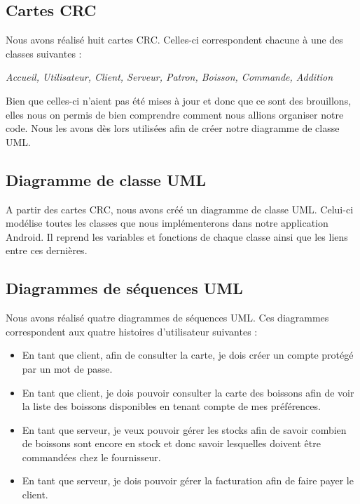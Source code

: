 \documentclass[11pt, a4, oneside, headings=normal]{scrreprt}
\begin{document}
\subsection*{Cartes CRC}

Nous avons réalisé huit cartes CRC. Celles-ci correspondent chacune à une des classes suivantes :

\begin{center}
\emph{Accueil, Utilisateur, Client, Serveur, Patron, Boisson, Commande, Addition}
\end{center}

Bien que celles-ci n'aient pas été mises à jour et donc que ce sont des brouillons, elles nous on permis de bien comprendre comment nous allions organiser notre code. Nous les avons dès lors utilisées afin de créer notre diagramme de classe UML.

\subsection*{Diagramme de classe UML}

A partir des cartes CRC, nous avons créé un diagramme de classe UML. Celui-ci modélise toutes les classes que nous implémenterons dans notre application Android. Il reprend les variables et fonctions de chaque classe ainsi que les liens entre ces dernières.

\subsection*{Diagrammes de séquences UML}

Nous avons réalisé quatre diagrammes de séquences UML. Ces diagrammes correspondent aux quatre histoires d'utilisateur suivantes : 

\begin{itemize}
\item En tant que client, afin de consulter la carte, je dois créer un compte protégé par un mot de passe.
\item En tant que client, je dois pouvoir consulter la carte des boissons afin de voir la liste des boissons disponibles en tenant compte de mes préférences.
\item En tant que serveur, je veux pouvoir gérer les stocks afin de savoir combien de boissons sont encore en stock et donc savoir lesquelles doivent être commandées chez le fournisseur.
\item En tant que serveur, je dois pouvoir gérer la facturation afin de faire payer le client.
\end{itemize}
\end{document}
